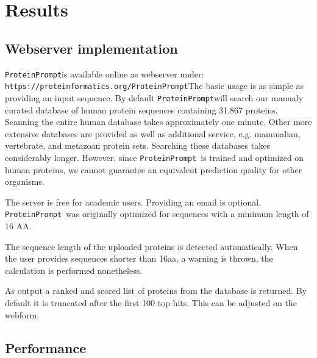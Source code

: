 \documentclass[preprint,3p,times,twocolumn]{elsarticle}
\newcommand{\TODO}[1] {\begingroup\color{red}#1\endgroup}
\newcommand{\url}[1]{\texttt{https://\small #1}}
\newcommand{\toolblank}{\texttt{ProteinPrompt}}
\newcommand{\tool}{\toolblank\hspace{2pt}}
\newcommand{\website}{\url{proteinformatics.org/\tool}}
\begin{document}

\section{Results}

\subsection{Webserver implementation}

\tool is available online as webserver under: \website The basic usage
is as simple as providing an input sequence. By default \tool will
search our manualy curated database of human protein sequences
containing 31.867 proteins. Scanning the entire human database takes
approximately one minute. Other more extensive databases are provided
as well as additional service, e.g. mammalian, vertebrate, and
metazoan protein sets. Searching these databases takes considerably
longer. However, since \tool\ is trained and optimized
on human proteins, we cannot guarantee an equivalent prediction
quality for other organisms. 

The server is free for academic users. Providing an email is
optional.
\tool\ was originally optimized for sequences with a minimum length of 16 AA.

%

The sequence length of the uploaded proteins is detected automatically. When the user provides
sequences shorter than 16aa, a warning is thrown,
the calculation is performed nonetheless.

As output a ranked and scored list of proteins from the database is
returned. By default it is truncated after the first 100 top
hits. This can be adjusted on the webform. 


\subsection{Performance}
\label{performance}
\end{document}

